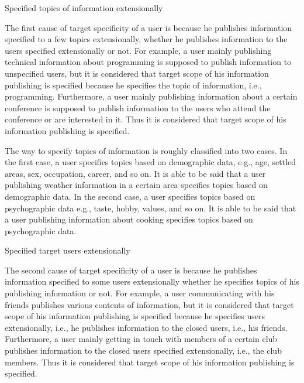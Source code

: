 \begin{description}
\bf {\item[(1)] Specified topics of information extensionally}
\label{item:Topic}
\end{description}

The first cause of target specificity of a user is because
he publishes information specified to a few topics extensionally,
whether he publishes information to the users specified extensionally or
not.  For example, a user mainly publishing technical
information about programming is supposed to publish information to
unspecified users, but it is considered that target scope of
his information publishing is specified because he specifies the
topic of information, i.e., programming.  Furthermore, a user mainly
publishing information about a certain conference is supposed to publish
information to the users who attend the conference or are interested in
it.  Thus it is considered that target scope of his
information publishing is specified.

The way to specify topics of information is roughly classified into two
cases.  In the first case, a user specifies topics based on demographic
data, e.g., age, settled areas, sex, occupation, career, and so on.  It
is able to be said that a user publishing weather information in a
certain area specifies topics based on demographic data.  In the second
case, a user specifies topics based on psychographic data e.g., taste,
hobby, values, and so on.  It is able to be said that a user
publishing information about cooking specifies topics based on
psychographic data.

\begin{description}
\bf{\item[(2)] Specified target users extensionally}
\label{item:User}
\end{description}

The second cause of target specificity of a user is because
he publishes information specified to some users extensionally
whether he specifies topics of his publishing
information or not.  For example, a user communicating with his friends
publishes various contents of information, but it is considered that
target scope of his information publishing is specified because
he specifies users extensionally, i.e., he publishes
information to the closed users, i.e., his friends.  Furthermore, a user
mainly getting in touch with members of a certain club publishes
information to the closed users specified extensionally, i.e., the club
members.  Thus it is considered that target scope of
his information publishing is specified.

